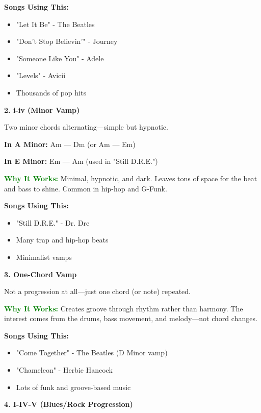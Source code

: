 \documentclass[11pt,letterpaper]{article}
\newcommand{\greentext}[1]{\textcolor{green}{\textbf{#1}}}
\begin{document}
\textbf{Songs Using This:}
\begin{itemize}[leftmargin=*]
\item "Let It Be" - The Beatles
\item "Don't Stop Believin'" - Journey
\item "Someone Like You" - Adele
\item "Levels" - Avicii
\item Thousands of pop hits
\end{itemize}

\vspace{0.5cm}

\textbf{2. i-iv (Minor Vamp)}

Two minor chords alternating—simple but hypnotic.

\textbf{In A Minor:} Am — Dm (or Am — Em)

\textbf{In E Minor:} Em — Am (used in "Still D.R.E.")

\textbf{\greentext{Why It Works:}} Minimal, hypnotic, and dark. Leaves tons of space for the beat and bass to shine. Common in hip-hop and G-Funk.

\textbf{Songs Using This:}
\begin{itemize}[leftmargin=*]
\item "Still D.R.E." - Dr. Dre
\item Many trap and hip-hop beats
\item Minimalist vamps
\end{itemize}

\vspace{0.5cm}

\textbf{3. One-Chord Vamp}

Not a progression at all—just one chord (or note) repeated.

\textbf{\greentext{Why It Works:}} Creates groove through rhythm rather than harmony. The interest comes from the drums, bass movement, and melody—not chord changes.

\textbf{Songs Using This:}
\begin{itemize}[leftmargin=*]
\item "Come Together" - The Beatles (D Minor vamp)
\item "Chameleon" - Herbie Hancock
\item Lots of funk and groove-based music
\end{itemize}

\vspace{0.5cm}

\textbf{4. I-IV-V (Blues/Rock Progression)}
\end{document}
